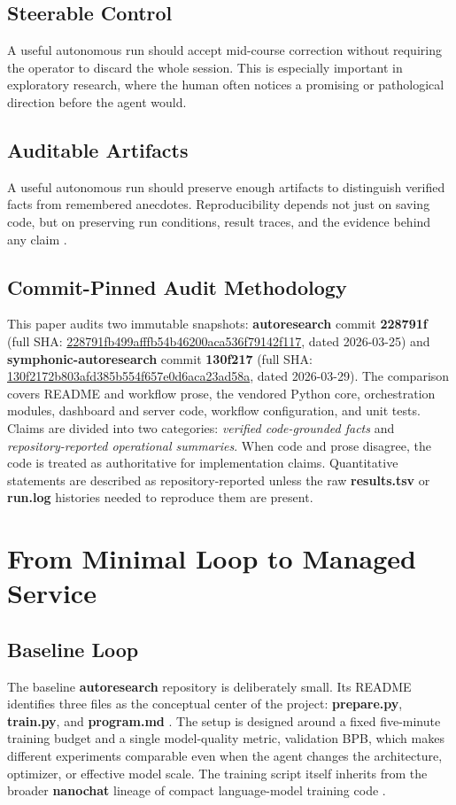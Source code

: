 \documentclass[conference]{IEEEtran}
\newcommand{\file}[1]{{\ttfamily\bfseries\textcolor{accentteal}{#1}}}
\begin{document}
\subsection{Steerable Control}
A useful autonomous run should accept mid-course correction without requiring the operator to discard the whole session. This is especially important in exploratory research, where the human often notices a promising or pathological direction before the agent would.

\subsection{Auditable Artifacts}
A useful autonomous run should preserve enough artifacts to distinguish verified facts from remembered anecdotes. Reproducibility depends not just on saving code, but on preserving run conditions, result traces, and the evidence behind any claim \cite{ref_bouthillier,ref_mlflow}.

\subsection{Commit-Pinned Audit Methodology}
This paper audits two immutable snapshots: \file{autoresearch} commit \file{228791f} (full SHA: \url{228791fb499afffb54b46200aca536f79142f117}, dated 2026-03-25) and \file{symphonic-autoresearch} commit \file{130f217} (full SHA: \url{130f2172b803afd385b554f657e0d6aca23ad58a}, dated 2026-03-29). The comparison covers README and workflow prose, the vendored Python core, orchestration modules, dashboard and server code, workflow configuration, and unit tests. Claims are divided into two categories: \emph{verified code-grounded facts} and \emph{repository-reported operational summaries}. When code and prose disagree, the code is treated as authoritative for implementation claims. Quantitative statements are described as repository-reported unless the raw \file{results.tsv} or \file{run.log} histories needed to reproduce them are present.

\section{From Minimal Loop to Managed Service}
\subsection{Baseline Loop}
The baseline \file{autoresearch} repository is deliberately small. Its README identifies three files as the conceptual center of the project: \file{prepare.py}, \file{train.py}, and \file{program.md} \cite{ref_autoresearch}. The setup is designed around a fixed five-minute training budget and a single model-quality metric, validation BPB, which makes different experiments comparable even when the agent changes the architecture, optimizer, or effective model scale. The training script itself inherits from the broader \file{nanochat} lineage of compact language-model training code \cite{ref_nanochat}.
\end{document}
